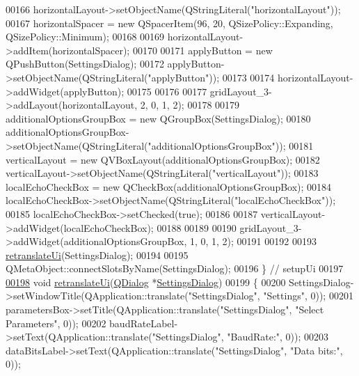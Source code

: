 \begin{DoxyCode}
00166         horizontalLayout->setObjectName(QStringLiteral(\textcolor{stringliteral}{"horizontalLayout"}));
00167         horizontalSpacer = \textcolor{keyword}{new} QSpacerItem(96, 20, QSizePolicy::Expanding, QSizePolicy::Minimum);
00168 
00169         horizontalLayout->addItem(horizontalSpacer);
00170 
00171         applyButton = \textcolor{keyword}{new} QPushButton(SettingsDialog);
00172         applyButton->setObjectName(QStringLiteral(\textcolor{stringliteral}{"applyButton"}));
00173 
00174         horizontalLayout->addWidget(applyButton);
00175 
00176 
00177         gridLayout\_3->addLayout(horizontalLayout, 2, 0, 1, 2);
00178 
00179         additionalOptionsGroupBox = \textcolor{keyword}{new} QGroupBox(SettingsDialog);
00180         additionalOptionsGroupBox->setObjectName(QStringLiteral(\textcolor{stringliteral}{"additionalOptionsGroupBox"}));
00181         verticalLayout = \textcolor{keyword}{new} QVBoxLayout(additionalOptionsGroupBox);
00182         verticalLayout->setObjectName(QStringLiteral(\textcolor{stringliteral}{"verticalLayout"}));
00183         localEchoCheckBox = \textcolor{keyword}{new} QCheckBox(additionalOptionsGroupBox);
00184         localEchoCheckBox->setObjectName(QStringLiteral(\textcolor{stringliteral}{"localEchoCheckBox"}));
00185         localEchoCheckBox->setChecked(\textcolor{keyword}{true});
00186 
00187         verticalLayout->addWidget(localEchoCheckBox);
00188 
00189 
00190         gridLayout\_3->addWidget(additionalOptionsGroupBox, 1, 0, 1, 2);
00191 
00192 
00193         \hyperlink{a00082_a7a0adf32eef516ceffcc0633a90c3b34}{retranslateUi}(SettingsDialog);
00194 
00195         QMetaObject::connectSlotsByName(SettingsDialog);
00196     \} \textcolor{comment}{// setupUi}
00197 
\hypertarget{a00141_source_l00198}{}\hyperlink{a00082_a7a0adf32eef516ceffcc0633a90c3b34}{00198}     \textcolor{keywordtype}{void} \hyperlink{a00082_a7a0adf32eef516ceffcc0633a90c3b34}{retranslateUi}(\hyperlink{a00051}{QDialog} *\hyperlink{a00075}{SettingsDialog})
00199     \{
00200         SettingsDialog->setWindowTitle(QApplication::translate(\textcolor{stringliteral}{"SettingsDialog"}, \textcolor{stringliteral}{"Settings"}, 0));
00201         parametersBox->setTitle(QApplication::translate(\textcolor{stringliteral}{"SettingsDialog"}, \textcolor{stringliteral}{"Select Parameters"}, 0));
00202         baudRateLabel->setText(QApplication::translate(\textcolor{stringliteral}{"SettingsDialog"}, \textcolor{stringliteral}{"BaudRate:"}, 0));
00203         dataBitsLabel->setText(QApplication::translate(\textcolor{stringliteral}{"SettingsDialog"}, \textcolor{stringliteral}{"Data bits:"}, 0));

\end{DoxyCode}
